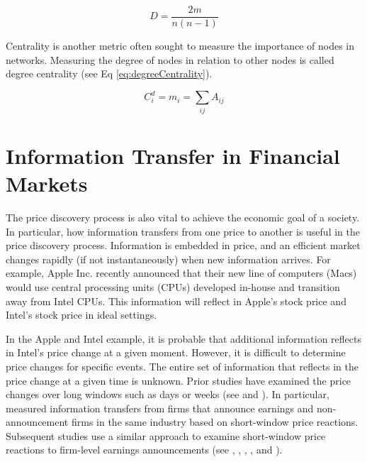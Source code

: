 \begin{equation}
    \label{eq:density}
    D = \frac{2m}{n (n-1)}
\end{equation}

Centrality is another metric often sought to measure the importance of nodes in networks. Measuring the degree of nodes in relation to other nodes is called degree centrality (see Eq \ref{eq:degreeCentrality}). 

\begin{equation}
    \label{eq:degreeCentrality}
    C_i^d =  m_i = \sum_{ij}A_{ij}
\end{equation}


\section{Information Transfer in Financial Markets} \label{IFinFM}

The price discovery process is also vital to achieve the economic goal of a society.   In particular, how information transfers from one price to another is useful in the price discovery process.  Information is embedded in price, and an efficient market changes rapidly (if not instantaneously) when new information arrives.  For example, Apple Inc. recently announced that their new line of computers (Macs) would use central processing units (CPUs) developed in-house and transition away from Intel CPUs.  This information will reflect in Apple's stock price and Intel's stock price in ideal settings.

In the Apple and Intel example, it is probable that additional information reflects in Intel's price change at a given moment. However, it is difficult to determine price changes for specific events. The entire set of information that reflects in the price change at a given time is unknown.  Prior studies have examined the price changes over long windows such as days or weeks (see \cite{Foster1981} and \cite{Baginiski1987}).  In particular, \cite{Foster1981} measured information transfers from firms that announce earnings and non-announcement firms in the same industry based on short-window price reactions.  Subsequent studies use a similar approach to examine short-window price reactions to firm-level earnings announcements (see \cite{ClinchSinclair1987},   \cite{PownallWaymire1989},  \cite{HanWild1990},  \cite{Wang2014},  and \cite{HannKimZheng2019}).   %

